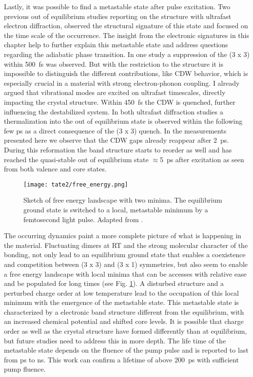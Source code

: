 Lastly, it was possible to find a metastable state after pulse excitation.
Two previous out of equilibrium studies reporting on the structure with ultrafast electron diffraction, observed the structural signature of this state and focused on the time scale of the occurrence.
The insight from the electronic signatures in this chapter help to further explain this metastable state and address questions regarding the adiabatic phase transition.
In one study \cite{domrose_femtosecond_2024} a suppression of the (3 x 3) within \qty{500}{\femto\second} was observed.
But with the restriction to the structure it is impossible to distinguish the different contributions, like CDW behavior, which is especially crucial in a material with strong electron-phonon coupling.
I already argued that vibrational modes are excited on ultrafast timescales, directly impacting the crystal structure.
Within \qty{450}{\femto\second} the CDW is quenched, further influencing the destabilized system.
In both ultrafast diffraction studies a thermalization into the out of equilibrium state is observed within the following few \unit{\pico\second} as a direct consequence of the (3 x 3) quench.
In the measurements presented here we observe that the CDW gaps already reappear after \qty{2}{\pico\second}.
During this reformation the band structure starts to reorder as well and has reached the quasi-stable out of equilibrium state $\approx$\qty{5}{\pico\second} after excitation as seen from both valence and core states.

\begin{figure}
	\centering
	\texttt{[image: tate2/free\_energy.png]}
	\caption{Sketch of free energy landscape with two minima. The equilibrium ground state is switched to a local, metastable minimum by a femtosecond light pulse. Adapted from \cite{basov_towards_2017}.}
	\label{fig:free_energy}
\end{figure}

The occurring dynamics paint a more complete picture of what is happening in the material.
Fluctuating  dimers at RT and the strong molecular character of the bonding, not only lead to an equilibrium ground state that enables a coexistence and competition between (3 x 3) and (3 x 1) symmetries, but also seem to enable a free energy landscape with local minima that can be accesses with relative ease and be populated for long times (see Fig. \ref{fig:free_energy}).
A disturbed structure and a perturbed charge order at low temperature lead to the occupation of this local minimum with the emergence of the metastable state.
This metastable state is characterized by a electronic band structure different from the equilibrium, with an increased chemical potential and shifted core levels.
It is possible that charge order as well as the crystal structure have formed differently than at equilibrium, but future studies need to address this in more depth.
The life time of the metastable state depends on the fluence of the pump pulse and is reported to last from \unit{\pico\second} to \unit{\nano\second}.
This work can confirm a lifetime of above \qty{200}{\pico\second} with sufficient pump fluence.

